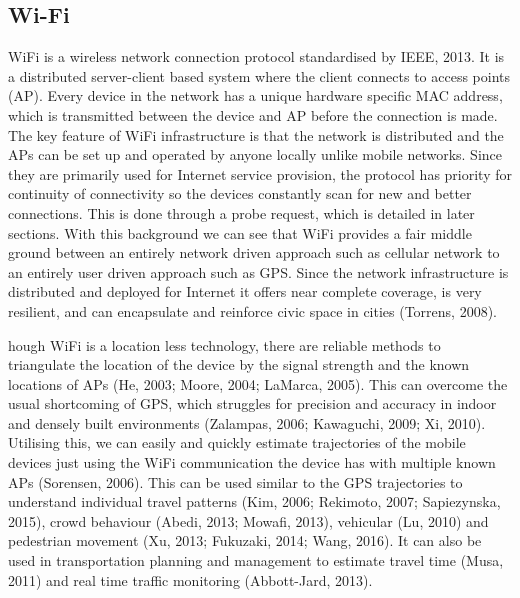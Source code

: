 \subsection{Wi-Fi}

WiFi is a wireless network connection protocol standardised by IEEE, 2013.
It is a distributed server-client based system where the client connects to access points (AP).
Every device in the network has a unique hardware specific MAC address, which is transmitted between the device and AP before the connection is made.
The key feature of WiFi infrastructure is that the network is distributed and the APs can be set up and operated by anyone locally unlike mobile networks.
Since they are primarily used for Internet service provision, the protocol has priority for continuity of connectivity so the devices constantly scan for new and better connections.
This is done through a probe request, which is detailed in later sections.
With this background we can see that WiFi provides a fair middle ground between an entirely network driven approach such as cellular network to an entirely user driven approach such as GPS.
Since the network infrastructure is distributed and deployed for Internet it offers near complete coverage, is very resilient,  and can encapsulate and reinforce civic space in cities (Torrens, 2008).

hough WiFi is a location less technology, there are reliable methods to triangulate the location of the device by the signal strength and the known locations of APs (He, 2003; Moore, 2004; LaMarca, 2005).
This can overcome the usual shortcoming of GPS, which struggles for precision and accuracy in indoor and densely built environments (Zalampas, 2006; Kawaguchi, 2009; Xi, 2010).
Utilising this, we can easily and quickly estimate trajectories of the mobile devices just using the WiFi communication the device has with multiple known APs (Sorensen, 2006).
This can be used similar to the GPS trajectories to understand individual travel patterns (Kim, 2006; Rekimoto, 2007; Sapiezynska, 2015), crowd behaviour (Abedi, 2013; Mowafi, 2013), vehicular (Lu, 2010) and pedestrian movement (Xu, 2013; Fukuzaki, 2014; Wang, 2016).
It can also be used in transportation planning and management to estimate travel time (Musa, 2011) and real time traffic monitoring (Abbott-Jard, 2013).

